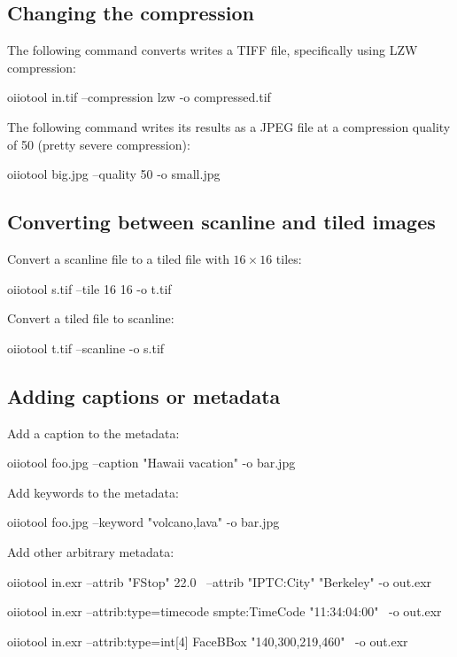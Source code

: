 \subsection*{Changing the compression}

The following command converts writes a TIFF file, specifically using
LZW compression:

\begin{code}
    oiiotool in.tif --compression lzw -o compressed.tif
\end{code}

The following command writes its results as a JPEG file at a 
compression quality of 50 (pretty severe compression):

\begin{code}
    oiiotool big.jpg --quality 50 -o small.jpg
\end{code}



\subsection*{Converting between scanline and tiled images}

Convert a scanline file to a tiled file with $16 \times 16$ tiles:

\begin{code}
    oiiotool s.tif --tile 16 16 -o t.tif
\end{code}

\noindent Convert a tiled file to scanline:

\begin{code}
    oiiotool t.tif --scanline -o s.tif
\end{code}



\subsection*{Adding captions or metadata}

\noindent Add a caption to the metadata:
\begin{code}
    oiiotool foo.jpg --caption "Hawaii vacation" -o bar.jpg
\end{code}

\noindent Add keywords to the metadata:
\begin{code}
    oiiotool foo.jpg --keyword "volcano,lava" -o bar.jpg
\end{code}

\noindent Add other arbitrary metadata:
\begin{code}
    oiiotool in.exr --attrib "FStop" 22.0 \
            --attrib "IPTC:City" "Berkeley" -o out.exr

    oiiotool in.exr --attrib:type=timecode smpte:TimeCode "11:34:04:00" \
            -o out.exr

    oiiotool in.exr --attrib:type=int[4] FaceBBox "140,300,219,460" \
            -o out.exr
\end{code}


